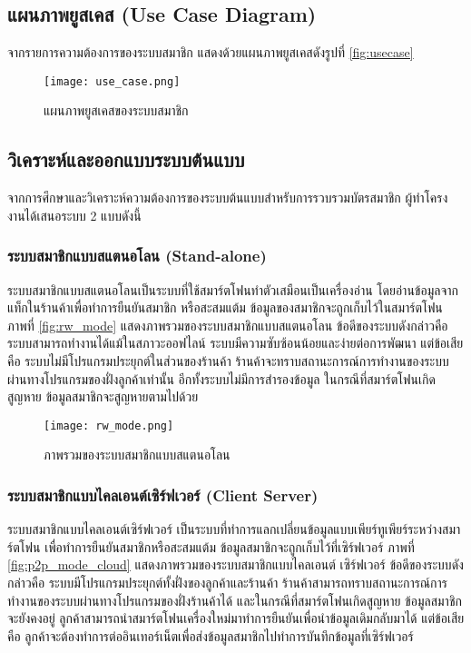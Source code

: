 \documentclass[12pt,a4paper]{article}
\begin{document}
\subsection{แผนภาพยูสเคส (Use Case Diagram)}
จากรายการความต้องการของระบบสมาชิก แสดงด้วยแผนภาพยูสเคสดังรูปที่ \ref{fig:usecase}

\begin{figure}[ht!]
\centering
\texttt{[image: use\_case.png]}
\caption{แผนภาพยูสเคสของระบบสมาชิก} \label{fig:usecase}
\label{overflow}
\end{figure}

\subsection{วิเคราะห์และออกแบบระบบต้นแบบ}

จากการศึกษาและวิเคราะห์ความต้องการของระบบต้นแบบสำหรับการรวบรวมบัตรสมาชิก ผู้ทำโครงงานได้เสนอระบบ 2 แบบดังนี้

\subsubsection{ระบบสมาชิกแบบสแตนอโลน (Stand-alone)}
ระบบสมาชิกแบบสแตนอโลนเป็นระบบที่ใช้สมาร์ตโฟนทำตัวเสมือนเป็นเครื่องอ่าน โดยอ่านข้อมูลจากแท็กในร้านค้าเพื่อทำการยืนยันสมาชิก หรือสะสมแต้ม ข้อมูลของสมาชิกจะถูกเก็บไว้ในสมาร์ตโฟน ภาพที่ \ref{fig:rw_mode} แสดงภาพรวมของระบบสมาชิกแบบสแตนอโลน ข้อดีของระบบดังกล่าวคือ ระบบสามารถทำงานได้แม้ในสภาวะออฟไลน์ ระบบมีความซับซ้อนน้อยและง่ายต่อการพัฒนา แต่ข้อเสียคือ ระบบไม่มีโปรแกรมประยุกต์ในส่วนของร้านค้า ร้านค้าจะทราบสถานะการณ์การทำงานของระบบผ่านทางโปรแกรมของฝั่งลูกค้าเท่านั้น อีกทั้งระบบไม่มีการสำรองข้อมูล ในกรณีที่สมาร์ตโฟนเกิดสูญหาย ข้อมูลสมาชิกจะสูญหายตามไปด้วย

\begin{figure}[ht!]
\centering
\texttt{[image: rw\_mode.png]}
\caption{ภาพรวมของระบบสมาชิกแบบสแตนอโลน} \label{fig:rw_mode}
\label{overflow}
\end{figure}

\subsubsection{ระบบสมาชิกแบบไคลเอนต์เซิร์ฟเวอร์ (Client Server)}
ระบบสมาชิกแบบไคลเอนต์เซิร์ฟเวอร์ เป็นระบบที่ทำการแลกเปลี่ยนข้อมูลแบบเพียร์ทูเพียร์ระหว่างสมาร์ตโฟน เพื่อทำการยืนยันสมาชิกหรือสะสมแต้ม ข้อมูลสมาชิกจะถูกเก็บไว้ที่เซิร์ฟเวอร์ ภาพที่ \ref{fig:p2p_mode_cloud} แสดงภาพรวมของระบบสมาชิกแบบไคลเอนต์ เซิร์ฟเวอร์ ข้อดีของระบบดังกล่าวคือ ระบบมีโปรแกรมประยุกต์ทั้งฝั่งของลูกค้าและร้านค้า ร้านค้าสามารถทราบสถานะการณ์การทำงานของระบบผ่านทางโปรแกรมของฝั่งร้านค้าได้ และในกรณีที่สมาร์ตโฟนเกิดสูญหาย ข้อมูลสมาชิกจะยังคงอยู่ ลูกค้าสามารถนำสมาร์ตโฟนเครื่องใหม่มาทำการยืนยันเพื่อนำข้อมูลเดิมกลับมาได้ แต่ข้อเสียคือ ลูกค้าจะต้องทำการต่ออินเทอร์เน็ตเพื่อส่งข้อมูลสมาชิกไปทำการบันทึกข้อมูลที่เซิร์ฟเวอร์
\end{document}
